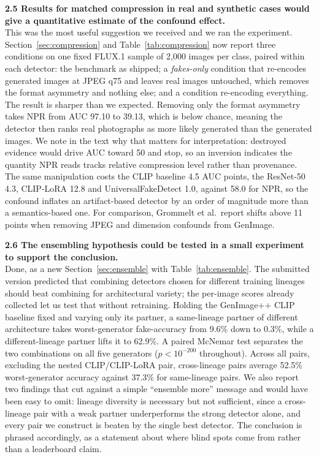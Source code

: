 \documentclass[3p,times,procedia]{elsarticle}
\begin{document}
\noindent\textbf{2.5 Results for matched compression in real and synthetic
cases would give a quantitative estimate of the confound effect.}\\[1pt]
This was the most useful suggestion we received and we ran the experiment.
Section~\ref{sec:compression} and Table~\ref{tab:compression} now report
three conditions on one fixed FLUX.1 sample of 2{,}000 images per class,
paired within each detector: the benchmark as shipped; a
\emph{fakes-only} condition that re-encodes generated images at JPEG q75
and leaves real images untouched, which removes the format asymmetry and
nothing else; and a condition re-encoding everything. The result is
sharper than we expected. Removing only the format asymmetry takes NPR
from AUC 97.10 to 39.13, which is below chance, meaning the detector then
ranks real photographs as more likely generated than the generated images.
We note in the text why that matters for interpretation: destroyed
evidence would drive AUC toward 50 and stop, so an inversion indicates the
quantity NPR reads tracks relative compression level rather than
provenance. The same manipulation costs the CLIP baseline 4.5 AUC points,
the ResNet-50 4.3, CLIP-LoRA 12.8 and UniversalFakeDetect 1.0, against
58.0 for NPR, so the confound inflates an artifact-based detector by an
order of magnitude more than a semantics-based one. For comparison,
Grommelt et al.\ report shifts above 11 points when removing JPEG and
dimension confounds from GenImage.

\noindent\textbf{2.6 The ensembling hypothesis could be tested in a small
experiment to support the conclusion.}\\[1pt]
Done, as a new Section~\ref{sec:ensemble} with Table~\ref{tab:ensemble}.
The submitted version predicted that combining detectors chosen for
different training lineages should beat combining for architectural
variety; the per-image scores already collected let us test that without
retraining. Holding the GenImage++ CLIP baseline fixed and varying only
its partner, a same-lineage partner of different architecture takes
worst-generator fake-accuracy from 9.6\% down to 0.3\%, while a
different-lineage partner lifts it to 62.9\%. A paired McNemar test
separates the two combinations on all five generators
($p<10^{-200}$ throughout). Across all pairs, excluding the nested
CLIP/CLIP-LoRA pair, cross-lineage pairs average 52.5\% worst-generator
accuracy against 37.3\% for same-lineage pairs. We also report two
findings that cut against a simple ``ensemble more'' message and would
have been easy to omit: lineage diversity is necessary but not sufficient,
since a cross-lineage pair with a weak partner underperforms the strong
detector alone, and every pair we construct is beaten by the single best
detector. The conclusion is phrased accordingly, as a statement about
where blind spots come from rather than a leaderboard claim.
\end{document}
